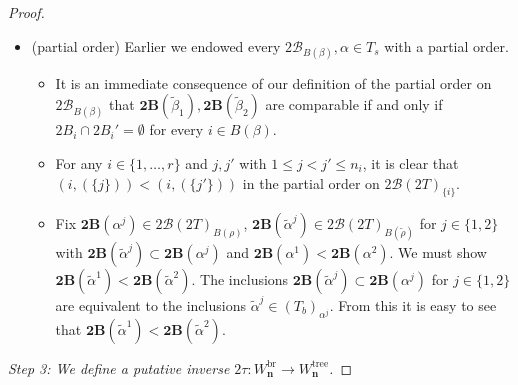 \documentclass[11pt]{amsart}
\theoremstyle{definition}
\theoremstyle{remark}
\theoremstyle{plain}
\newcommand\bn{\mathbf{n}}
\newcommand{\btB}{{\mathbf{2B}}}
\newcommand{\stB}{2\mathscr{B}}
\newcommand{\on}{\operatorname}
\newcommand{\tree}{{\on{tree}}}
\newcommand{\br}{{\on{br}}}
\newcommand{\wt}{\widetilde}
\begin{document}
\begin{proof}
\begin{itemize}
\medskip

\item[] {\sc(partial order)} Earlier we endowed every $\stB_{B(\beta)}, \alpha \in T_s$ with a partial order.
\begin{itemize}
\item It is an immediate consequence of our definition of the partial order on $\stB_{B(\beta)}$ that $\btB(\wt\beta_1), \btB(\wt\beta_2)$ are comparable if and only if $2B_i \cap 2B_i' = \emptyset$ for every $i \in B(\beta)$.

\item For any $i \in \{1,\ldots,r\}$ and $j,j'$ with $1 \leq j < j' \leq n_i$, it is clear that $(i,(\{j\})) < (i,(\{j'\}))$ in the partial order on $\stB(2T)_{\{i\}}$.

\item Fix $\btB(\alpha^j) \in \stB(2T)_{B(\rho)}$, $\btB(\wt\alpha^j) \in \stB(2T)_{B(\wt\rho)}$ for $j \in \{1,2\}$ with $\btB(\wt\alpha^j) \subset \btB(\alpha^j)$ and $\btB(\alpha^1) < \btB(\alpha^2)$.
We must show $\btB(\wt\alpha^1) < \btB(\wt\alpha^2)$.
The inclusions $\btB(\wt\alpha^j) \subset \btB(\alpha^j)$ for $j \in \{1,2\}$ are equivalent to the inclusions $\wt\alpha^j \in (T_b)_{\alpha^j}$.
From this it is easy to see that $\btB(\wt\alpha^1) < \btB(\wt\alpha^2)$.
\end{itemize}
\end{itemize}


\medskip

\noindent\emph{Step 3: We define a putative inverse $2\tau\colon W_\bn^\br \to W_\bn^\tree$.}

\medskip


\end{proof}
\end{document}
